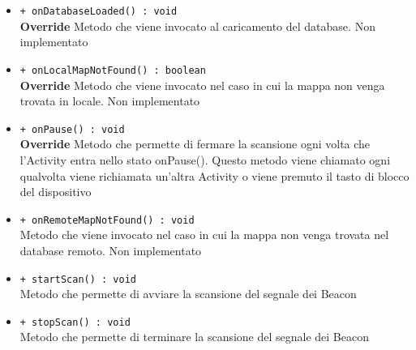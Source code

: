 \documentclass[../DefinizioneDiProdotto.tex]{subfiles}
\begin{document}
\begin{description}
\begin{itemize}
		\item \texttt{+ onDatabaseLoaded() : void}\\
		\textbf{Override} Metodo che viene invocato al caricamento del database. Non implementato
		\item \texttt{+ onLocalMapNotFound() : boolean}\\
		\textbf{Override} Metodo che viene invocato nel caso in cui la mappa non venga trovata in locale. Non implementato
		\item \texttt{+ onPause() : void}\\
		\textbf{Override} Metodo che permette di fermare la scansione ogni volta che l'Activity entra nello stato onPause(). Questo metodo viene chiamato ogni qualvolta viene richiamata un'altra Activity o viene premuto il tasto di blocco del dispositivo
		\item \texttt{+ onRemoteMapNotFound() : void}\\
		Metodo che viene invocato nel caso in cui la mappa non venga trovata nel database remoto. Non implementato
		
		\item \texttt{+ startScan() : void}\\
		Metodo che permette di avviare la scansione del segnale dei Beacon
		\item \texttt{+ stopScan() : void}\\
		Metodo che permette di terminare la scansione del segnale dei Beacon
	\end{itemize}
\end{description}
\end{document}
